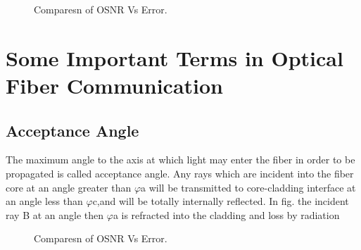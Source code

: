 \documentclass[12pt]{report}
\begin{document}
	\begin{figure}[htbp]
		\caption{Comparesn of OSNR Vs Error.}
		\label{fig1}
	\end{figure}
	\section{Some Important Terms in Optical Fiber Communication }
	\subsection{ Acceptance Angle}
	The maximum angle to the axis at which light may enter the fiber in order to be propagated is called acceptance angle. 
	Any rays which are incident into the fiber core at an angle greater than $\varphi$a will be transmitted to core-cladding interface at an angle less than $\varphi$c,and will be totally internally reflected. 
	In fig. the incident ray B at an angle then $\varphi$a is refracted into the cladding and loss by radiation
	\begin{figure}[htbp]
		\caption{Comparesn of OSNR Vs Error.}
		\label{fig1}
	\end{figure}
	
\end{document}
